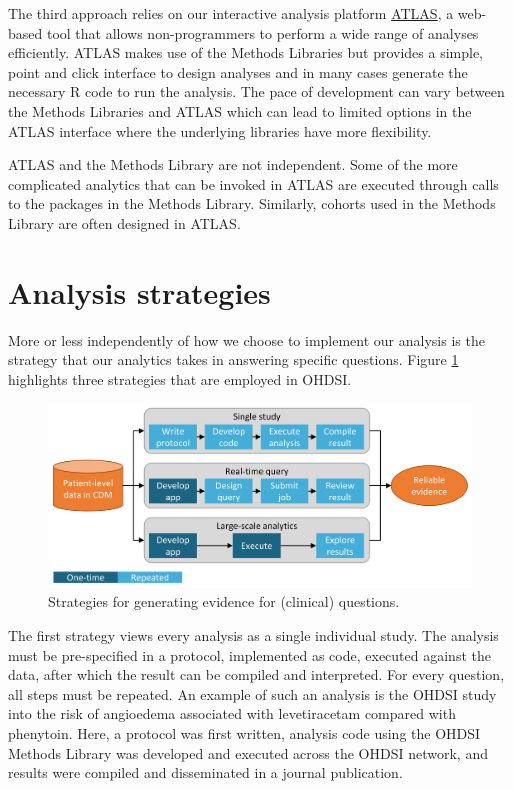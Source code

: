\documentclass[11pt]{book}
\theoremstyle{definition}
\theoremstyle{definition}
\theoremstyle{definition}
\theoremstyle{remark}
\begin{document}
The third approach relies on our interactive analysis platform \href{https://github.com/OHDSI/Atlas/wiki}{ATLAS}, a web-based tool that allows non-programmers to perform a wide range of analyses efficiently. ATLAS makes use of the Methods Libraries but provides a simple, point and click interface to design analyses and in many cases generate the necessary R code to run the analysis. The pace of development can vary between the Methods Libraries and ATLAS which can lead to limited options in the ATLAS interface where the underlying libraries have more flexibility.

ATLAS and the Methods Library are not independent. Some of the more complicated analytics that can be invoked in ATLAS are executed through calls to the packages in the Methods Library. Similarly, cohorts used in the Methods Library are often designed in ATLAS.

\hypertarget{analysis-strategies}{%
\section{Analysis strategies}\label{analysis-strategies}}

More or less independently of how we choose to implement our analysis is the strategy that our analytics takes in answering specific questions. Figure \ref{fig:strategies} highlights three strategies that are employed in OHDSI.

\begin{figure}

{\centering \includegraphics[width=0.9\linewidth]{images/OhdsiAnalyticsTools/strategies} 

}

\caption{Strategies for generating evidence for (clinical) questions.}\label{fig:strategies}
\end{figure}

The first strategy views every analysis as a single individual study. The analysis must be pre-specified in a protocol, implemented as code, executed against the data, after which the result can be compiled and interpreted. For every question, all steps must be repeated. An example of such an analysis is the OHDSI study into the risk of angioedema associated with levetiracetam compared with phenytoin. \citep{duke_2017} Here, a protocol was first written, analysis code using the OHDSI Methods Library was developed and executed across the OHDSI network, and results were compiled and disseminated in a journal publication.
\end{document}
